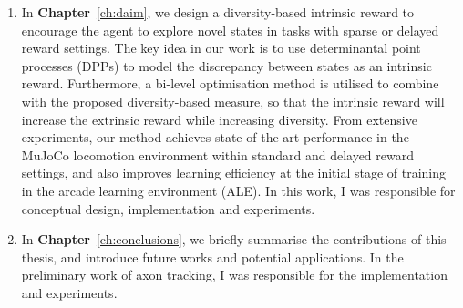 \begin{enumerate}
    \item In \textbf{Chapter}~\ref{ch:daim}, we design a diversity-based intrinsic reward to encourage the agent to explore novel states in tasks with sparse or delayed reward settings. The key idea in our work is to use determinantal point processes (DPPs) to model the discrepancy between states as an intrinsic reward. Furthermore, a bi-level optimisation method is utilised to combine with the proposed diversity-based measure, so that the intrinsic reward will increase the extrinsic reward while increasing diversity. From extensive experiments, our method achieves state-of-the-art performance in the MuJoCo locomotion environment within standard and delayed reward settings, and also improves learning efficiency at the initial stage of training in the arcade learning environment (ALE). In this work, I was responsible for conceptual design, implementation and experiments.
    
    \item In \textbf{Chapter}~\ref{ch:conclusions}, we briefly summarise the contributions of this thesis, and introduce future works and potential applications. In the preliminary work of axon tracking, I was responsible for the implementation and experiments.
\end{enumerate}
